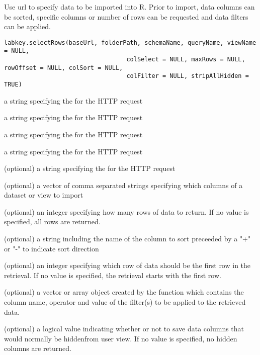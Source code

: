 \begin{Description}\relax
Use url to specify data to be imported into R. Prior to import, data columns
can be sorted, specific columns or number of rows can be requested and
data filters can be applied.
\end{Description}
\begin{Usage}
\begin{verbatim}
labkey.selectRows(baseUrl, folderPath, schemaName, queryName, viewName = NULL, 
                                  colSelect = NULL, maxRows = NULL, rowOffset = NULL, colSort = NULL, 
                                  colFilter = NULL, stripAllHidden = TRUE)
\end{verbatim}
\end{Usage}
\begin{Arguments}
\begin{ldescription}
\item[\code{baseUrl}] a string specifying the for the HTTP request
\item[\code{folderPath}] a string specifying the  for the HTTP request
\item[\code{schemaName}] a string specifying the   for the HTTP request
\item[\code{queryName}] a string specifying the  for the HTTP request
\item[\code{viewName}] (optional) a string specifying the  for the HTTP request
\item[\code{colSelect}] (optional) a vector of comma separated strings specifying which columns of a dataset or view to import
\item[\code{maxRows}] (optional) an integer specifying how many rows of data to return. If no value is specified, all rows are returned.
\item[\code{colSort}] (optional) a string including the name of the column to sort preceeded by a "+" or "-" to indicate sort direction
\item[\code{rowOffset}] (optional) an integer specifying which row of data should be the first row in the retrieval. If no
value is specified, the retrieval starts with the first row.
\item[\code{colFilter}] (optional) a vector or array object created by the  function which contains the
column name, operator and value of the filter(s) to be applied to the retrieved data.
\item[\code{stripAllHidden}] (optional) a logical value indicating whether or not to save data columns that would normally be hiddenfrom user view. If no value is specified, no hidden columns are returned.
\end{ldescription}
\end{Arguments}
